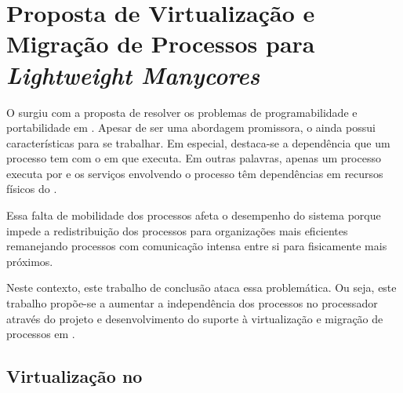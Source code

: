 \glsresetall
\chapter{Proposta de Virtualização e Migração de Processos para \textit{Lightweight Manycores}}
\label{chap.dev.virtualizacao}

O \nanvix surgiu com a proposta de resolver os problemas de programabilidade e portabilidade em \lws. Apesar de ser uma abordagem promissora, o \so ainda possui características para se trabalhar. Em especial, destaca-se a dependência que um processo tem com o \cluster em que executa. Em outras palavras, apenas um processo executa por \cluster e os serviços envolvendo o processo têm dependências em recursos físicos do \cluster.

Essa falta de mobilidade dos processos afeta o desempenho do sistema porque impede a redistribuição dos processos para organizações mais eficientes \eg remanejando processos com comunicação intensa entre si para \clusters fisicamente mais próximos. 

Neste contexto, este trabalho de conclusão ataca essa problemática. Ou seja, este trabalho propõe-se a aumentar a independência dos processos no processador através do projeto e desenvolvimento do suporte à virtualização e migração de processos em \lws.





\section{Virtualização no \nanvix}

